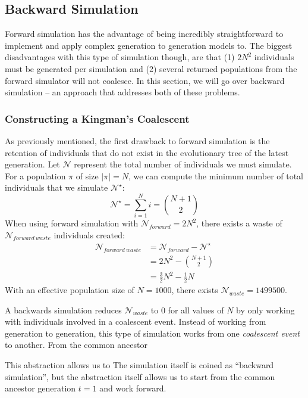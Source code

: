 \subsection{Backward Simulation}\label{subsec:bs}
Forward simulation has the advantage of being incredibly straightforward to implement and apply complex generation to
generation models to.
The biggest disadvantages with this type of simulation though, are that (1) $2N^2$ individuals must
be generated per simulation and (2) several returned populations from the forward simulator will not coalesce.
In this section, we will go over backward simulation -- an approach that addresses both of these problems.

\subsubsection{Constructing a Kingman's Coalescent}
As previously mentioned, the first drawback to forward simulation is the retention of individuals that do not exist in
the evolutionary tree of the latest generation.
Let $\mathcal{N}$ represent the total number of individuals we must simulate.
For a population $\pi$ of size $|\pi| = N$, we can compute the minimum number of total individuals that we simulate
$\mathcal{N}^\star$:
\begin{equation}
    \mathcal{N}^\star = \sum_{i=1}^N i = \binom{N + 1}{2}
\end{equation}
When using forward simulation with $\mathcal{N}_{forward} = 2N^2$, there exists a waste of
$\mathcal{N}_{{forward \ waste}}$ individuals created:
\begin{equation}
    \begin{aligned}
        \mathcal{N}_{{forward \ waste}} &= \mathcal{N}_{forward} - \mathcal{N}^\star \\
        &= 2N^2 - \binom{N + 1}{2} \\
        &= \frac{3}{2}N^2 - \frac{1}{2}N
    \end{aligned}
\end{equation}
With an effective population size of $N = 1000$, there exists $\mathcal{N}_{waste} = 1499500$.

A backwards simulation reduces $\mathcal{N}_{waste}$ to 0 for all values of $N$ by only working with individuals
involved in a coalescent event.
Instead of working from generation to generation, this type of simulation works from one \emph{coalescent event} to
another.
From the common ancestor


This abstraction allows us to
The simulation itself is coined as ``backward simulation'', but the abstraction itself allows us to start from the
common ancestor generation $t = 1$ and work forward.

